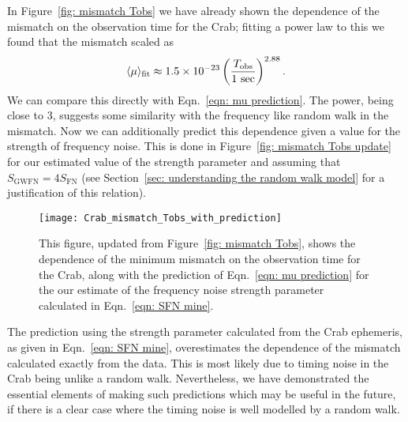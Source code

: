 \documentclass[../full_thesis/full_thesis.tex]{subfiles}
\begin{document}
{In Figure~\ref{fig: mismatch Tobs} we have already shown the dependence of the
mismatch on the observation time for the Crab; fitting a power law to this
we found that the mismatch scaled as
\begin{align}
\langle \mu \rangle_{\textrm{fit}} \approx 1.5 \times 10^{-23} 
\left(\frac{T_{\mathrm{obs}}}{1 \textrm{ sec}}\right)^{2.88}.
\end{align}
We can compare this directly with Eqn.~\eqref{eqn: mu prediction}. The power,
being close to $3$, suggests some similarity with the frequency like random
walk in the mismatch.  Now we can additionally predict this dependence given a
value for the strength of frequency noise. This is done in Figure~\ref{fig:
mismatch Tobs update} for our estimated value of the strength parameter and
assuming that $S_{\textrm{GWFN}} = 4S_\textrm{FN}$ (see Section~\ref{sec:
understanding the random walk model} for a justification of this relation).
\begin{figure}[htb]
\centering
\texttt{[image: Crab\_mismatch\_Tobs\_with\_prediction]}
\caption{This figure, updated from Figure~\ref{fig: mismatch Tobs}, shows the
dependence of the minimum mismatch on the observation time for the Crab, along
with the prediction of Eqn.~\eqref{eqn: mu prediction} for the our estimate of
the frequency noise strength parameter calculated in Eqn.~\eqref{eqn: SFN mine}.}
\label{fig: mismatch Tobs update}
\end{figure}
The prediction using the strength parameter calculated from the Crab ephemeris,
as given in Eqn.~\eqref{eqn: SFN mine}, overestimates the dependence of the
mismatch calculated exactly from the data. This is most likely due to timing
noise in the Crab being unlike a random walk. Nevertheless, we have
demonstrated the essential elements of making such predictions which may be useful
in the future, if there is a clear case where the timing noise is well
modelled by a random walk.
 

}
\end{document}
